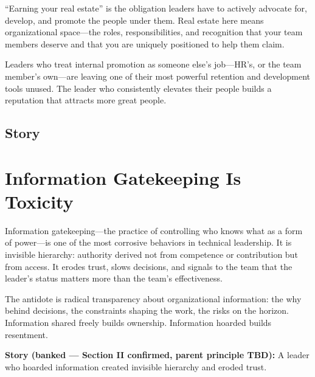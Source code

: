 
``Earning your real estate'' is the obligation leaders have to actively advocate
for, develop, and promote the people under them. Real estate here means
organizational space---the roles, responsibilities, and recognition that your
team members deserve and that you are uniquely positioned to help them claim.

Leaders who treat internal promotion as someone else's job---HR's, or the
team member's own---are leaving one of their most powerful retention and
development tools unused. The leader who consistently elevates their people
builds a reputation that attracts more great people.

\subsection{Story}

\section{Information Gatekeeping Is Toxicity}


Information gatekeeping---the practice of controlling who knows what as a
form of power---is one of the most corrosive behaviors in technical leadership.
It is invisible hierarchy: authority derived not from competence or contribution
but from access. It erodes trust, slows decisions, and signals to the team that
the leader's status matters more than the team's effectiveness.

The antidote is radical transparency about organizational information:
the why behind decisions, the constraints shaping the work, the risks on the
horizon. Information shared freely builds ownership. Information hoarded
builds resentment.

\begin{storybox}
\textbf{Story (banked --- Section II confirmed, parent principle TBD):}
A leader who hoarded information created invisible hierarchy and eroded trust.
\end{storybox}
